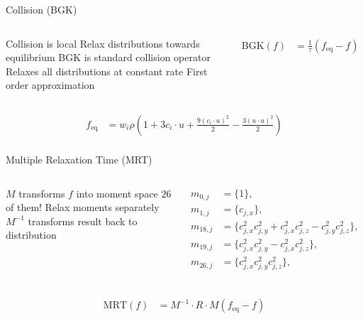 \begin{frame}{Collision (BGK)}
\begin{columns}
\begin{outline}
\1 Collision is local
\1 Relax distributions towards equilibrium
\1 BGK is standard collision operator
\2 Relaxes all distributions at constant rate
\1 First order approximation
\end{outline}
\begin{center}
\begin{align*}
    \text{BGK}(f) &= \frac{1}{\tau} (f_{\text{eq}} - f)
\end{align*}
\end{center}
\end{columns}
\vspace{1cm}
\begin{align*}
   f_{\text{eq}} &= w_i \rho \left(
1 + 3 c_i \cdot u  + \frac{9 (c_i \cdot u)^2}{2}
- \frac{3 (u \cdot u)^2}{2}\right) \\
\end{align*}
\end{frame}

\begin{frame}{Multiple Relaxation Time (MRT)}
\begin{columns}
\begin{outline}
\1 $M$ transforms $f$ into moment space
\1 $26$ of them!
\1 Relax moments separately
\1 $M^{-1}$ transforms result back to distribution
\end{outline}
\begin{center}
\begin{align*}
m_{0,j} &= \{  1 \},\\
m_{1,j} &= \{  c_{j,x} \}, \\
m_{18,j} &= \{ c_{j,x}^2 c_{j,y}^2 + c_{j,x}^2 c_{j,z}^2 - c_{j,y}^2 c_{j,z}^2 \}, \\
m_{19,j} &= \{ c_{j,x}^2 c_{j,y}^2 - c_{j,x}^2 c_{j,z}^2 \},\\
m_{26,j} &= \{ c_{j,x}^2 c_{j,y}^2 c_{j,z}^2 \},\\
\end{align*}
\end{center}
\end{columns}
\begin{center}
  \begin{align*}
\text{MRT}(f) &= M^{-1} \cdot R \cdot M(f_{\text{eq}} - f)
  \end{align*}
\end{center}
\end{frame}

